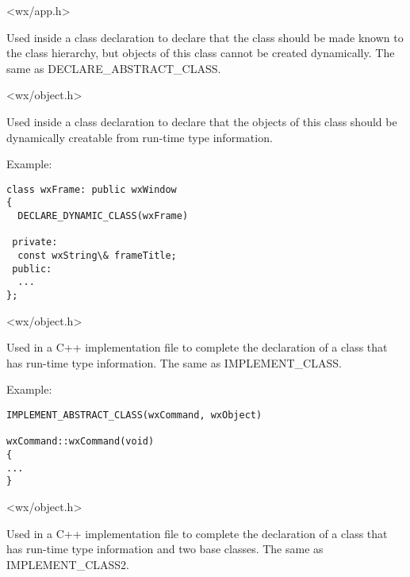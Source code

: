 
<wx/app.h>

\label{declareclass}


Used inside a class declaration to declare that the class should be
made known to the class hierarchy, but objects of this class cannot be created
dynamically. The same as DECLARE\_ABSTRACT\_CLASS.


<wx/object.h>

\label{declaredynamicclass}


Used inside a class declaration to declare that the objects of this class should be dynamically
creatable from run-time type information.

Example:

\begin{verbatim}
class wxFrame: public wxWindow
{
  DECLARE_DYNAMIC_CLASS(wxFrame)

 private:
  const wxString\& frameTitle;
 public:
  ...
};
\end{verbatim}


<wx/object.h>

\label{implementabstractclass}


Used in a C++ implementation file to complete the declaration of
a class that has run-time type information. The same as IMPLEMENT\_CLASS.

Example:

\begin{verbatim}
IMPLEMENT_ABSTRACT_CLASS(wxCommand, wxObject)

wxCommand::wxCommand(void)
{
...
}
\end{verbatim}


<wx/object.h>

\label{implementabstractclass2}


Used in a C++ implementation file to complete the declaration of
a class that has run-time type information and two base classes. The same as IMPLEMENT\_CLASS2.

